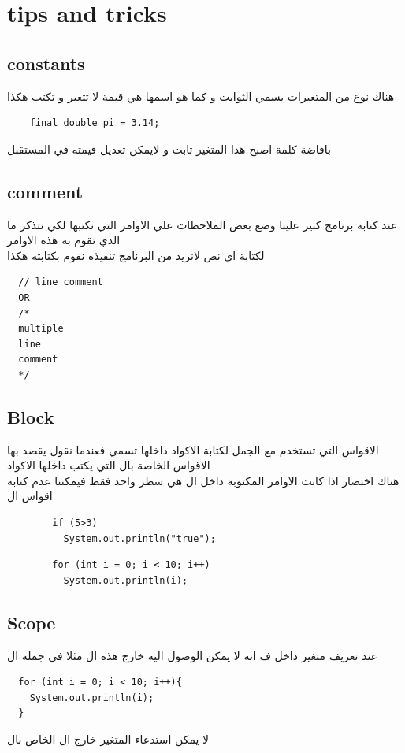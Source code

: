\section{tips and tricks}
\subsection{constants}
\begin{AR}
  هناك نوع من المتغيرات يسمي الثوابت و كما هو اسمها هي قيمة لا تتغير و تكتب هكذا
\end{AR}
\begin{verbatim}
    final double pi = 3.14;
\end{verbatim}
\begin{AR}
  بافاضة كلمة  اصبح هذا المتغير ثابت و لايمكن تعديل قيمته في المستقبل
\end{AR}
\subsection{comment}
\begin{AR}
  عند كتابة برنامج كبير علينا وضع بعض الملاحظات علي الاوامر التي نكتبها لكي نتذكر ما الذي تقوم به هذه الاوامر
  \\
  لكتابة اي نص لانريد من البرنامج تنفيذه نقوم بكتابته هكذا
\end{AR}
\begin{verbatim}
  // line comment
  OR
  /*
  multiple 
  line 
  comment
  */
\end{verbatim}
\newpage
\subsection{Block}
\begin{AR}
  الاقواس التي تستخدم مع الجمل لكتابة الاكواد داخلها \LR{{ }} تسمي  فعندما نقول  
  يقصد بها الاقواس الخاصة بال التي يكتب داخلها الاكواد
  \\
  هناك اختصار اذا كانت الاوامر المكتوبة داخل ال هي سطر واحد فقط فيمكننا عدم كتابة اقواس ال 
\end{AR}
\begin{verbatim}
        if (5>3)
          System.out.println("true");
\end{verbatim}
\begin{verbatim}
        for (int i = 0; i < 10; i++) 
          System.out.println(i);
\end{verbatim}
\subsection{Scope}
\begin{AR}
  عند تعريف متغير داخل  ف انه لا يمكن الوصول اليه خارج هذه ال مثلا في جملة ال 
\end{AR}
\begin{verbatim}
  for (int i = 0; i < 10; i++){ 
    System.out.println(i);
  }
\end{verbatim}
\begin{AR}
  لا يمكن استدعاء المتغير  خارج ال  الخاص بال 
\end{AR}
